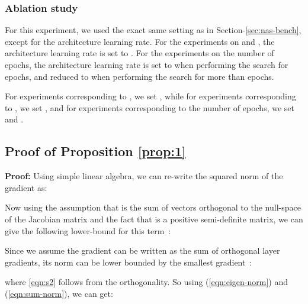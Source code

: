 \documentclass{article} \usepackage{fancyhdr, iclr2023_conference, times}
\begin{document}
\subsubsection{Ablation study}
 For this experiment, we used the exact same setting as in Section-\ref{sec:nas-bench}, except for the architecture learning rate. For the experiments on  and , the architecture learning rate is set to . For the experiments on the number of epochs, the architecture learning rate is set to  when performing the search for  epochs, and reduced to  when performing the search for more than  epochs.
 \par For experiments corresponding to , we set , while for experiments corresponding to , we set , and for experiments corresponding to the number of epochs, we set  and .
 \subsection{Proof of Proposition \ref{prop:1}}
 \label{appndx:proof}
 \textbf{Proof:} Using simple linear algebra, we can re-write the squared norm of the gradient  as:
 
 Now using the assumption that  is the sum of vectors orthogonal to the null-space of the Jacobian matrix and the fact that  is a positive semi-definite matrix, we can give the following lower-bound for this term~\citep{DBLP:books/siam/Meyer00}:

Since we assume the gradient  can be written as the sum of orthogonal layer gradients, its norm can be lower bounded by the smallest gradient~\citep{DBLP:books/siam/Meyer00}:


where \ref{eqn:s2} follows from the orthogonality. So using (\ref{eqn:eigen-norm}) and (\ref{eqn:sum-norm}), we can get:
\end{document}
